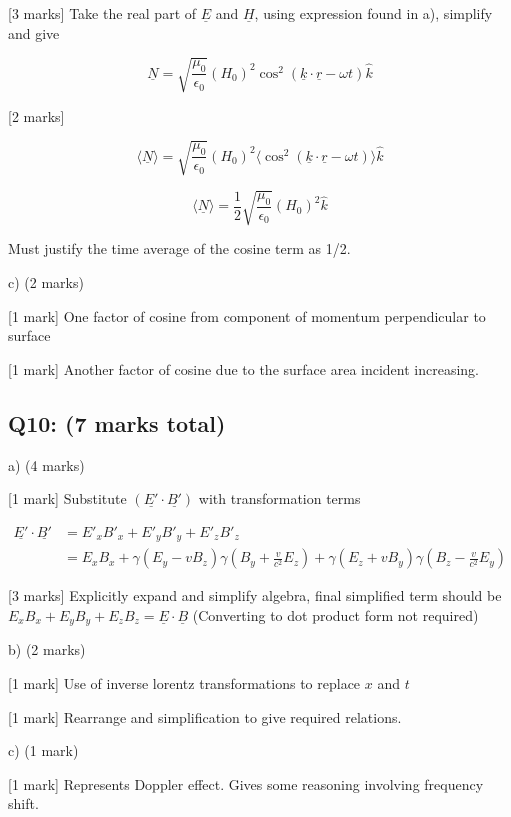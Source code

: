 \documentclass[a4paper,11pt]{article}
\begin{document}
[3 marks] Take the real part of \( \underline{E} \) and \( \underline{H} \), using expression found in a), simplify and give 

\[ \underline{N} = \sqrt{\frac{\mu_0}{\epsilon_0}} (H_0)^2 \cos^2(\underline{k} \cdot \underline{r} - \omega t) \hat{k} \]

[2 marks] 

\[ \langle \underline{N} \rangle = \sqrt{\frac{\mu_0}{\epsilon_0}} (H_0)^2 \langle \cos^2(\underline{k} \cdot \underline{r} - \omega t) \rangle \hat{k} \]

\[ \langle \underline{N} \rangle = \frac{1}{2}\sqrt{\frac{\mu_0}{\epsilon_0}} (H_0)^2 \hat{k} \]

Must justify the time average of the cosine term as 1/2.

c) (2 marks) 

[1 mark] One factor of cosine from component of momentum perpendicular to surface

[1 mark] Another factor of cosine due to the surface area incident increasing. 



\subsection*{Q10: (7 marks total)}

a) (4 marks)

[1 mark] Substitute \( (\underline{E'} \cdot \underline{B'}) \) with transformation terms

\begin{align*}
    \underline{E'} \cdot \underline{B'} & = E'_x B'_x + E'_y B'_y + E'_z B'_z \\ & = E_{x} B_{x} + \gamma(E_{y} - vB_{z}) \gamma(B_{y} + \frac{v}{c^{2}} E_{z}) + \gamma(E_{z} + vB_{y}) \gamma(B_{z} - \frac{v}{c^{2}} E_{y})
\end{align*}

[3 marks] Explicitly expand and simplify algebra, final simplified term should be \( E_x B_x + E_y B_y + E_z B_z = \underline{E} \cdot \underline{B} \) (Converting to dot product form not required)

b) (2 marks)

[1 mark] Use of inverse lorentz transformations to replace \( x \) and \( t \)

[1 mark] Rearrange and simplification to give required relations.

c) (1 mark)

[1 mark] Represents Doppler effect. Gives some reasoning involving frequency shift.
\end{document}

